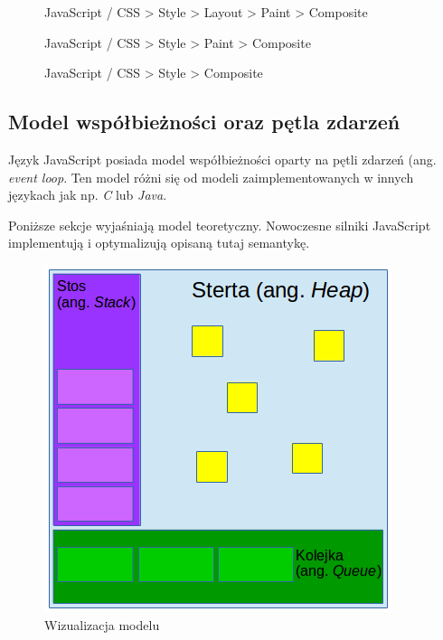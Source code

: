 \documentclass[polish, twoside, 12pt]{mwart}
\begin{document}
\begin{figure}[ht]
	\caption{JavaScript / CSS > Style > Layout > Paint > Composite}
\end{figure}

\begin{figure}[ht]
	\caption{JavaScript / CSS > Style > Paint > Composite}
\end{figure}

\begin{figure}[ht]
	\caption{JavaScript / CSS > Style > Composite}
\end{figure}

\subsection{Model współbieżności oraz pętla zdarzeń}

Język JavaScript posiada model współbieżności oparty na pętli zdarzeń (ang. \emph{event loop}. Ten model różni się od modeli zaimplementowanych w innych językach jak np. \emph{C} lub \emph{Java}.

Poniższe sekcje wyjaśniają model teoretyczny. Nowoczesne silniki JavaScript implementują i optymalizują opisaną tutaj semantykę.

\begin{figure}[ht]
  \includegraphics[width=\textwidth]{concurrency-model.png}
	\caption{Wizualizacja modelu}
\end{figure}
\end{document}
